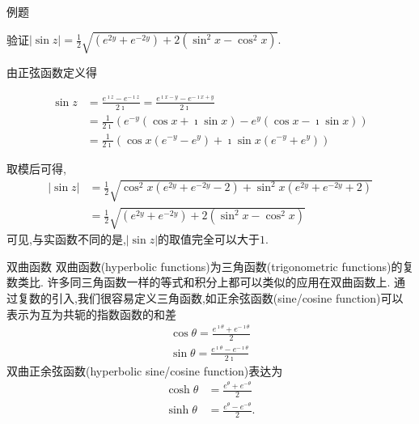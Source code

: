 \documentclass[fontset=windows, chinese, 10pt]{beamer}
\begin{document}
\begin{frame}{例题}
  {\begin{example}
      验证$
        |\sin z|=\frac{1}{2} \sqrt{\left(e^{2 y}+e^{-2 y}\right)+2\left(\sin ^2 x-\cos ^2 x\right)} .
       $
    \end{example}
  }
  {
    \begin{solution}
        由正弦函数定义得
 
        \begin{align*}
            \sin z &= \frac{e^{\imath z} - e^{-\imath z}}{2\imath}  = \frac{e^{\imath x - y} - e^{-\imath x + y}}{2\imath}
            \\ 
            & = \frac{1}{2\imath}\left( e^{-y} (\cos x + \imath \sin x ) - e^{y} (\cos x - \imath \sin x ) \right) 
            \\
            & = \frac{1}{2\imath} \left( \cos x (e^{-y} - e^{y}) + \imath \sin x (e^{-y} + e^{y}) \right)
        \end{align*}

        取模后可得,
        \begin{align*}
            |\sin z | &= \frac{1}{2}\sqrt{ \cos^2x (e^{2y} + e^{-2y} -2) + \sin^2 x (e^{2y} + e^{-2y} +2) }
            \\
            &=\frac{1}{2}\sqrt{\left(e^{2 y}+e^{-2 y}\right)+2\left(\sin ^2 x-\cos ^2 x\right)}
        \end{align*}
        可见,与实函数不同的是,$|\sin z|$的取值完全可以大于$1$.
    \end{solution}
  }
\end{frame}

\begin{frame}{双曲函数}
  双曲函数(hyperbolic functions)为三角函数(trigonometric functions)的复数类比.
  许多同三角函数一样的等式和积分上都可以类似的应用在双曲函数上.
  通过复数的引入,我们很容易定义三角函数,如正余弦函数(sine/cosine function)可以表示为互为共轭的指数函数的和差
  \begin{align}
      \cos \theta = \frac{e^{\imath \theta} + e^{ -\imath \theta} }{2}
      \\
      \sin \theta = \frac{e^{\imath \theta} - e^{ -\imath \theta} }{2\imath}
  \end{align}
  双曲正余弦函数(hyperbolic sine/cosine function)表达为
  \begin{align}
      \cosh \theta &= \frac{e^{\theta} + e^{ - \theta} }{2}
      \\
      \sinh \theta &= \frac{e^{\theta} - e^{ - \theta} }{2} .
  \end{align}
\end{frame}
\end{document}
